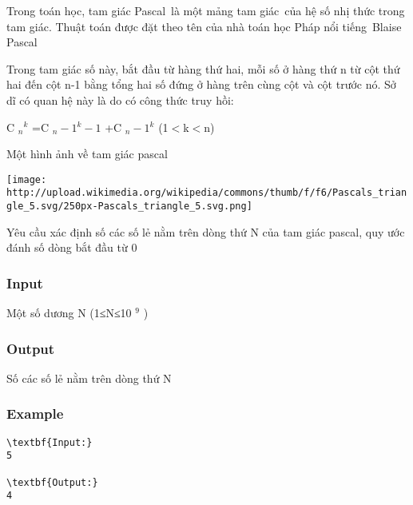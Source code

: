 



   Trong toán học, tam giác Pascal là một mảng tam giác của hệ số nhị thức trong tam giác. Thuật toán được đặt theo tên của nhà toán học Pháp nổi tiếng Blaise Pascal  

   Trong tam giác số này, bắt đầu từ hàng thứ hai, mỗi số ở hàng thứ n từ cột thứ hai đến cột n-1 bằng tổng hai số đứng ở hàng trên cùng cột và cột trước nó. Sở dĩ có quan hệ này là do có công thức truy hồi:  

   C   $_    n   $$^    k   $   =C   $_    n-1   $$^    k-1   $   +C   $_    n-1   $$^    k   $   (1$<$k$<$n)  

   Một hình ảnh về tam giác pascal  


\texttt{[image: http://upload.wikimedia.org/wikipedia/commons/thumb/f/f6/Pascals\_triangle\_5.svg/250px-Pascals\_triangle\_5.svg.png]}

   Yêu cầu xác định số các số lẻ nằm trên dòng thứ N của tam giác pascal, quy ước đánh số dòng bắt đầu từ 0  

\subsubsection{   Input  }

   Một số dương N (1≤N≤10   $^    9   $   )  

\subsubsection{   Output  }

   Số các số lẻ nằm trên dòng thứ N  

\subsubsection{   Example  }
\begin{verbatim}
\textbf{Input:}
5

\textbf{Output:}
4\end{verbatim}